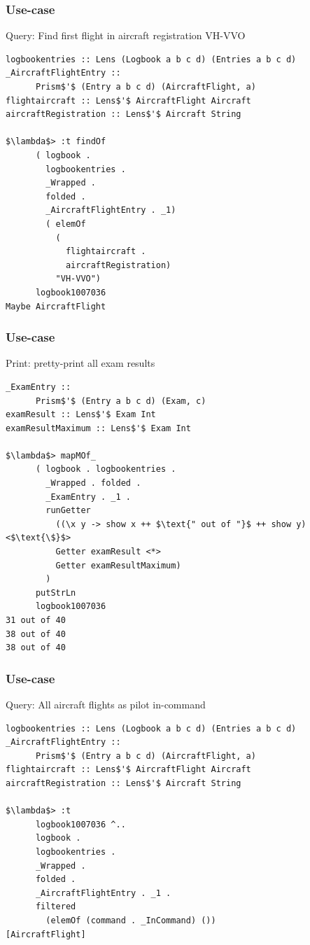 \begin{frame}[fragile]
\frametitle{Use-case}
\begin{block}{Query: Find first flight in aircraft registration VH-VVO}
\begin{lstlisting}[style=haskell,basicstyle=\scriptsize\ttfamily,mathescape]
logbookentries :: Lens (Logbook a b c d) (Entries a b c d)
_AircraftFlightEntry ::
      Prism$'$ (Entry a b c d) (AircraftFlight, a)
flightaircraft :: Lens$'$ AircraftFlight Aircraft
aircraftRegistration :: Lens$'$ Aircraft String

$\lambda$> :t findOf
      ( logbook . 
        logbookentries . 
        _Wrapped . 
        folded . 
        _AircraftFlightEntry . _1)
        ( elemOf
          (
            flightaircraft . 
            aircraftRegistration)
          "VH-VVO")
      logbook1007036
Maybe AircraftFlight
\end{lstlisting}
\end{block}
\end{frame}

\begin{frame}[fragile]
\frametitle{Use-case}
\begin{block}{Print: pretty-print all exam results}
\begin{lstlisting}[style=haskell,basicstyle=\scriptsize\ttfamily,mathescape]
_ExamEntry ::
      Prism$'$ (Entry a b c d) (Exam, c)
examResult :: Lens$'$ Exam Int
examResultMaximum :: Lens$'$ Exam Int

$\lambda$> mapMOf_
      ( logbook . logbookentries .
        _Wrapped . folded .
        _ExamEntry . _1 .
        runGetter
          ((\x y -> show x ++ $\text{" out of "}$ ++ show y) <$\text{\$}$>
          Getter examResult <*>
          Getter examResultMaximum)
        )
      putStrLn
      logbook1007036
31 out of 40
38 out of 40
38 out of 40
\end{lstlisting}
\end{block}
\end{frame}

\begin{frame}[fragile]
\frametitle{Use-case}
\begin{block}{Query: All aircraft flights as pilot in-command}
\begin{lstlisting}[style=haskell,basicstyle=\scriptsize\ttfamily,mathescape]
logbookentries :: Lens (Logbook a b c d) (Entries a b c d)
_AircraftFlightEntry ::
      Prism$'$ (Entry a b c d) (AircraftFlight, a)
flightaircraft :: Lens$'$ AircraftFlight Aircraft
aircraftRegistration :: Lens$'$ Aircraft String

$\lambda$> :t
      logbook1007036 ^..
      logbook .
      logbookentries .
      _Wrapped .
      folded .
      _AircraftFlightEntry . _1 .
      filtered
        (elemOf (command . _InCommand) ())
[AircraftFlight]
\end{lstlisting}
\end{block}
\end{frame}


